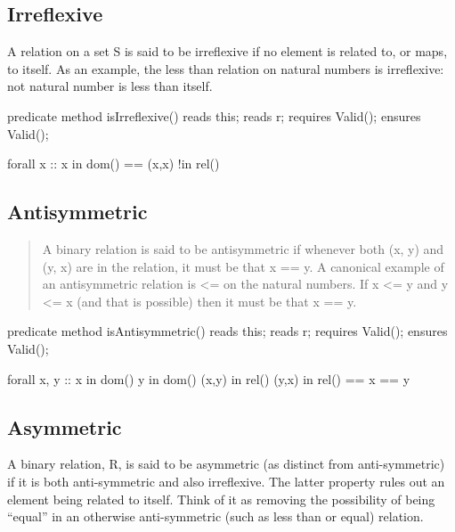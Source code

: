 \documentclass[letterpaper,10pt,english]{sphinxmanual}
\begin{document}
\subsection{Irreflexive}
\label{\detokenize{08-relations:irreflexive}}
A relation on a set S is said to be irreflexive if no element is
related to, or maps, to itself.  As an example, the less than relation
on natural numbers is irreflexive: not natural number is less than
itself.

\begin{sphinxVerbatim}[commandchars=\\\{\}]
predicate method isIrreflexive()
    reads this;
    reads r;
    requires Valid();
    ensures Valid();

\PYGZob{}
    forall x :: x in dom() ==\PYGZgt{} (x,x) !in rel()
\PYGZcb{}
\end{sphinxVerbatim}


\subsection{Antisymmetric}
\label{\detokenize{08-relations:antisymmetric}}\begin{quote}

A binary relation is said to be antisymmetric
if whenever both (x, y) and (y, x) are in the
relation, it must be that x == y. A canonical
example of an antisymmetric relation is \textless{}= on
the natural numbers. If x \textless{}= y and y \textless{}= x (and
that is possible) then it must be that x == y.
\end{quote}

\begin{sphinxVerbatim}[commandchars=\\\{\}]
predicate method isAntisymmetric()
    reads this;
    reads r;
    requires Valid();
    ensures Valid();

\PYGZob{}
    forall x, y ::     x in dom()   \PYGZam{}\PYGZam{}   y in dom() \PYGZam{}\PYGZam{}
                   (x,y) in rel() \PYGZam{}\PYGZam{} (y,x) in rel() ==\PYGZgt{}
                   x == y
\PYGZcb{}
\end{sphinxVerbatim}


\subsection{Asymmetric}
\label{\detokenize{08-relations:asymmetric}}
A binary relation, R, is said to be asymmetric (as distinct from
anti-symmetric) if it is both anti-symmetric and also irreflexive. The
latter property rules out an element being related to itself. Think of
it as removing the possibility of being “equal” in an otherwise
anti-symmetric (such as less than or equal) relation.
\end{document}
